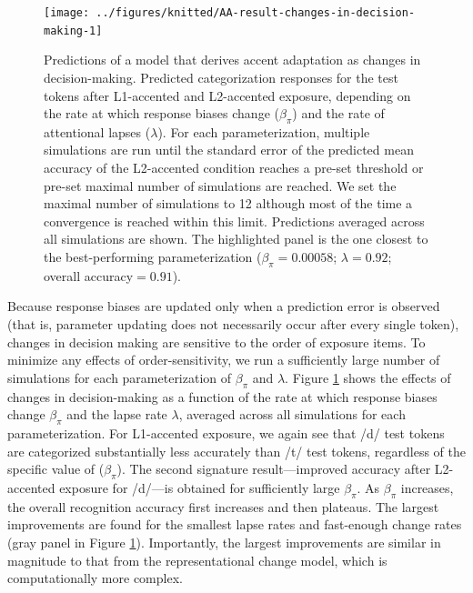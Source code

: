 \documentclass[
  11pt,
  english,
  man,floatsintext]{apa6}
\begin{document}
\begin{figure}

{\centering \texttt{[image: ../figures/knitted/AA-result-changes-in-decision-making-1]} 

}

\caption{Predictions of a model that derives accent adaptation as changes in decision-making. Predicted categorization responses for the test tokens after L1-accented and L2-accented exposure, depending on the rate at which response biases change (\(\beta_{\pi}\)) and the rate of attentional lapses (\(\lambda\)). For each parameterization, multiple simulations are run until the standard error of the predicted mean accuracy of the L2-accented condition reaches a pre-set threshold or pre-set maximal number of simulations are reached. We set the maximal number of simulations to 12 although most of the time a convergence is reached within this limit. Predictions averaged across all simulations are shown. The highlighted panel is the one closest to the best-performing parameterization (\(\beta_{\pi} = 0.00058\); \(\lambda=0.92\); overall accuracy\(=0.91\)).}\label{fig:AA-result-changes-in-decision-making}
\end{figure}

Because response biases are updated only when a prediction error is observed (that is, parameter updating does not necessarily occur after every single token), changes in decision making are sensitive to the order of exposure items. To minimize any effects of order-sensitivity, we run a sufficiently large number of simulations for each parameterization of \(\beta_{\pi}\) and \(\lambda\). Figure \ref{fig:AA-result-changes-in-decision-making} shows the effects of changes in decision-making as a function of the rate at which response biases change \(\beta_{\pi}\) and the lapse rate \(\lambda\), averaged across all simulations for each parameterization. For L1-accented exposure, we again see that /d/ test tokens are categorized substantially less accurately than /t/ test tokens, regardless of the specific value of (\(\beta_{\pi}\)). The second signature result---improved accuracy after L2-accented exposure for /d/---is obtained for sufficiently large \(\beta_{\pi}\). As \(\beta_{\pi}\) increases, the overall recognition accuracy first increases and then plateaus. The largest improvements are found for the smallest lapse rates and fast-enough change rates (gray panel in Figure \ref{fig:AA-result-changes-in-decision-making}). Importantly, the largest improvements are similar in magnitude to that from the representational change model, which is computationally more complex.
\end{document}
